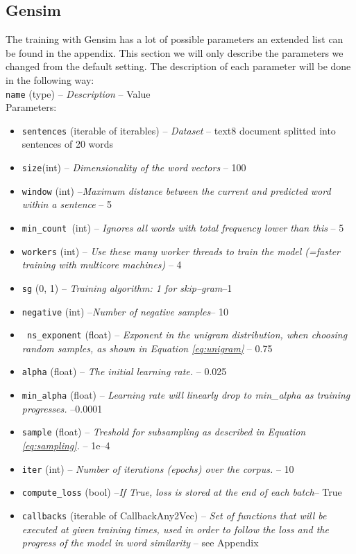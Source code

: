 \subsection{Gensim}
The training with Gensim has a lot of possible parameters an extended list can be found in the appendix. This section we will only describe the parameters we changed from the default setting.  The description of each parameter will be done in the following way: \\
\texttt{name} (type) -- \textit{Description} -- Value\\
Parameters:
\begin{itemize}
   \item \texttt{sentences} (iterable of iterables) -- \textit{Dataset} -- text8 document splitted into sentences of 20 words 
  \item \texttt{size}(int) – \textit{Dimensionality of the word vectors } -- 100
\item \texttt{window} (int) --\textit {Maximum distance between the current and predicted word within a sentence }-- 5
  \item  \texttt{min\_count }(int) --\textit{ Ignores all words with total frequency lower than this }-- 5
 \item   \texttt{workers} (int) -- \textit{ Use these many worker threads to train the model (=faster training with multicore machines) }-- 4 
\item    \texttt{sg} ({0, 1}) --\textit{ Training algorithm: 1 for skip--gram}--1
  \item  \texttt{negative} (int) --\textit{Number of negative samples}-- 10 
\item   \texttt{ ns\_exponent} (float) --\textit{ Exponent in the unigram distribution, when choosing random samples, as shown in Equation \ref{eq:unigram} }-- 0.75
\item    \texttt{alpha} (float) --\textit{ The initial learning rate. }-- 0.025
 \item   \texttt{min\_alpha} (float) --\textit{ Learning rate will linearly drop to min\_alpha as training progresses. }--0.0001
 \item   \texttt{sample} (float) --\textit{ Treshold for subsampling as described in Equation \ref{eq:sampling}. } -- 1e--4
  \item  \texttt{iter} (int) --\textit{ Number of iterations (epochs) over the corpus. }-- 10 
 \
  \item  \texttt{compute\_loss} (bool) --\textit{If True, loss is stored at the end of each batch}-- True
 \item   \texttt{callbacks} (iterable of CallbackAny2Vec) --\textit{ Set of functions that will be executed at given training times, used in order to follow the loss and the progress of the model in word similarity }-- see Appendix
\end{itemize}

